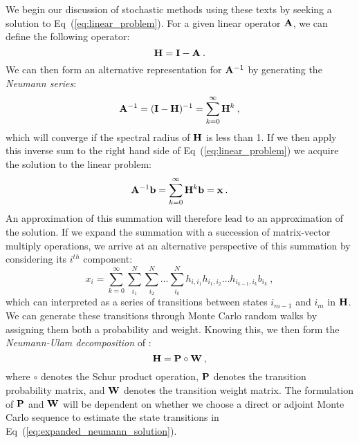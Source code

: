 We begin our discussion of stochastic methods using these texts by
seeking a solution to Eq~(\ref{eq:linear_problem}). For a given linear
operator $\mathbf{A}$, we can define the following operator:
\begin{equation}
  \mathbf{H} = \mathbf{I} - \mathbf{A}\:.
  \label{eq:linear_mc_iteration_matrix}
\end{equation}
We can then form an alternative representation for $\mathbf{A}^{-1}$ by
generating the \textit{Neumann series}:
\begin{equation}
  \mathbf{A}^{-1} = (\mathbf{I}-\mathbf{H})^{-1} = \sum_{k=0}^{\infty} \mathbf{H}^k\:,
  \label{eq:neumann_series}
\end{equation}
which will converge if the spectral radius of $\mathbf{H}$ is less than
1. If we then apply this inverse sum to the right hand side of
Eq~(\ref{eq:linear_problem}) we acquire the solution to the linear
problem:
\begin{equation}
  \mathbf{A}^{-1}\mathbf{b} = \sum_{k=0}^{\infty} \mathbf{H}^k\mathbf{b} = \mathbf{x}\:.
  \label{eq:neumann_solution}
\end{equation}
An approximation of this summation will therefore lead to an
approximation of the solution. If we expand the summation with a
succession of matrix-vector multiply operations, we arrive at an
alternative perspective of this summation by considering its $i^{th}$
component:
\begin{equation}
  x_i = \sum_{k=0}^{\infty}\sum_{i_1}^{N}\sum_{i_2}^{N}\ldots
  \sum_{i_k}^{N}h_{i,i_1}h_{i_1,i_2}\ldots h_{i_{k-1},i_k}b_{i_k}\:,
  \label{eq:expanded_neumann_solution}
\end{equation}
which can interpreted as a series of transitions between states
$i_{m-1}$ and $i_{m}$ in $\mathbf{H}$. We can generate these transitions
through Monte Carlo random walks by assigning them both a probability
and weight. Knowing this, we then form the \textit{Neumann-Ulam
  decomposition} of :
\begin{equation}
  \mathbf{H} = \mathbf{P} \circ \mathbf{W}\:,
  \label{eq:neumann_ulam_decomposition}
\end{equation}
where $\circ$ denotes the Schur product operation, $\mathbf{P}$ denotes
the transition probability matrix, and $\mathbf{W}$ denotes the transition
weight matrix. The formulation of $\mathbf{P}$ and $\mathbf{W}$ will be
dependent on whether we choose a direct or adjoint Monte Carlo
sequence to estimate the state transitions in
Eq~(\ref{eq:expanded_neumann_solution}).

